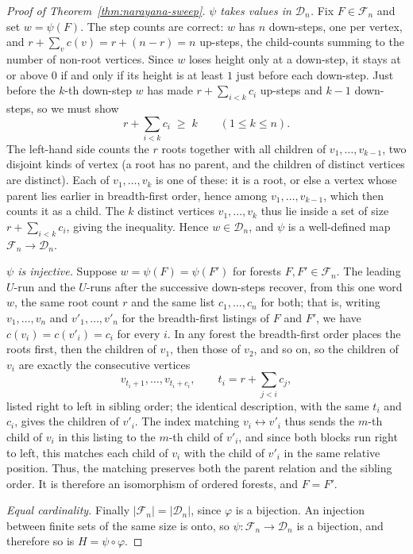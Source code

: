 \documentclass[11pt]{article}
\theoremstyle{definition}
\newcommand{\D}{\mathcal D}
\begin{document}
\begin{proof}[Proof of Theorem~\ref{thm:narayana-sweep}]
\vspace{0.5em}
\noindent\emph{$\psi$ takes values in $\D_n$.}  Fix $F\in\mathcal F_n$ and set
$w=\psi(F)$.  The step counts are correct: $w$ has $n$ down-steps, one per vertex, and
$r+\sum_v c(v)=r+(n-r)=n$ up-steps, the child-counts summing to the number of
non-root vertices.  Since $w$ loses height only at a down-step, it stays at or
above $0$ if and only if its height is at least $1$ just before each down-step.
Just before the $k$-th down-step $w$ has made $r+\sum_{i<k}c_i$ up-steps and
$k-1$ down-steps, so we must show
\[
   r+\sum_{i<k}c_i\;\ge\;k \qquad (1\le k\le n).
\]
The left-hand side counts the $r$ roots together with all children of
$v_1,\dots,v_{k-1}$, two disjoint kinds of vertex (a root has no parent, and the
children of distinct vertices are distinct).  Each of $v_1,\dots,v_k$ is one of
these: it is a root, or else a vertex whose parent lies earlier in breadth-first
order, hence among $v_1,\dots,v_{k-1}$, which then counts it as a child.  The $k$
distinct vertices $v_1,\dots,v_k$ thus lie inside a set of size
$r+\sum_{i<k}c_i$, giving the inequality.  Hence $w\in\D_n$, and $\psi$ is a
well-defined map $\mathcal F_n\to\D_n$.

\vspace{0.5em}
\noindent\emph{$\psi$ is injective.}  Suppose $w=\psi(F)=\psi(F')$ for forests
$F,F'\in\mathcal F_n$.  The leading $U$-run and the $U$-runs after the successive
down-steps recover, from this one word $w$, the same root count $r$ and the same
list $c_1,\dots,c_n$ for both; that is, writing $v_1,\dots,v_n$ and
$v'_1,\dots,v'_n$ for the breadth-first listings of $F$ and $F'$, we have
$c(v_i)=c(v'_i)=c_i$ for every $i$.  In any forest the breadth-first order places
the roots first, then the children of $v_1$, then those of $v_2$, and so on, so
the children of $v_i$ are exactly the consecutive vertices
\[
   v_{t_i+1},\dots,v_{t_i+c_i},\qquad t_i=r+\sum_{j<i}c_j,
\]
listed right to left in sibling order; the identical description, with the same
$t_i$ and $c_i$, gives the children of $v'_i$.  The index matching
$v_i\leftrightarrow v'_i$ thus sends the $m$-th child of $v_i$ in this listing to
the $m$-th child of $v'_i$, and since both blocks run right to left, this matches
each child of $v_i$ with the child of $v'_i$ in the same relative position.
Thus, the matching
preserves both the parent relation and the sibling order.  It is therefore an
isomorphism of ordered forests, and $F=F'$.

\vspace{0.5em}
\noindent\emph{Equal cardinality.}  Finally $|\mathcal F_n|=|\D_n|$, since $\varphi$ is a
bijection.  An injection between finite sets of the same size is onto, so
$\psi\colon\mathcal F_n\to\D_n$ is a bijection, and therefore so is
$H=\psi\circ\varphi$.


\end{proof}
\end{document}
